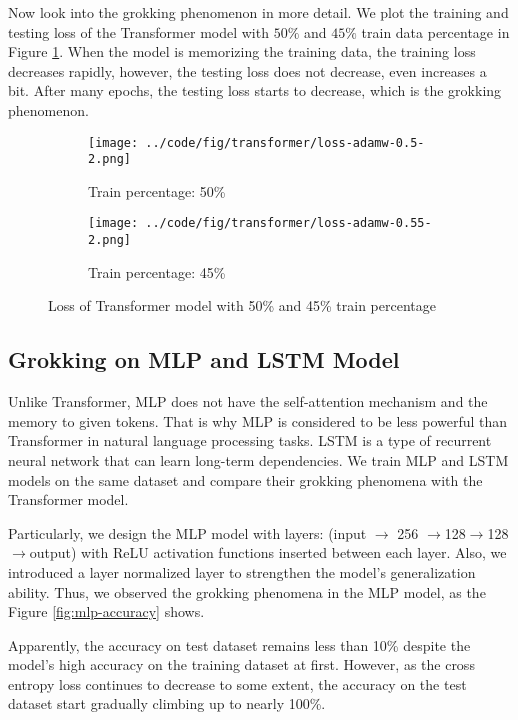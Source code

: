 \documentclass{article}
\begin{document}
Now look into the grokking phenomenon in more detail. We plot the training and testing loss of the Transformer model with $50\%$ and $45\%$ train data percentage in Figure \ref{fig:transformer-loss}. When the model is memorizing the training data, the training loss decreases rapidly, however, the testing loss does not decrease, even increases a bit. After many epochs, the testing loss starts to decrease, which is the grokking phenomenon.

\begin{figure}[ht]
    \centering
    \begin{subfigure}{0.45\textwidth}
        \texttt{[image: ../code/fig/transformer/loss-adamw-0.5-2.png]}
        \caption{Train percentage: 50\%}
    \end{subfigure}
    \begin{subfigure}{0.45\textwidth}
        \texttt{[image: ../code/fig/transformer/loss-adamw-0.55-2.png]}
        \caption{Train percentage: 45\%}
    \end{subfigure}
    \caption{Loss of Transformer model with 50\% and 45\% train percentage}
    \label{fig:transformer-loss}
\end{figure}

\subsection{Grokking on MLP and LSTM Model}

Unlike Transformer, MLP does not have the self-attention mechanism and the memory to given tokens. That is why MLP is considered to be less powerful than Transformer in natural language processing tasks. LSTM is a type of recurrent neural network that can learn long-term dependencies. We train MLP and LSTM models on the same dataset and compare their grokking phenomena with the Transformer model.

Particularly, we design the MLP model with layers: (input $\rightarrow$ 256 $\rightarrow $128$ \rightarrow $128$ \rightarrow $output) with ReLU activation functions inserted between each layer. Also, we introduced a layer normalized layer to strengthen the model's generalization ability. Thus, we observed the grokking phenomena in the MLP model, as the Figure \ref{fig:mlp-accuracy} shows.

Apparently, the accuracy on test dataset remains less than 10\% despite the model's high accuracy on the training dataset at first. However, as the cross entropy loss continues to decrease to some extent, the accuracy on the test dataset start gradually climbing up to nearly 100\%.
\end{document}
